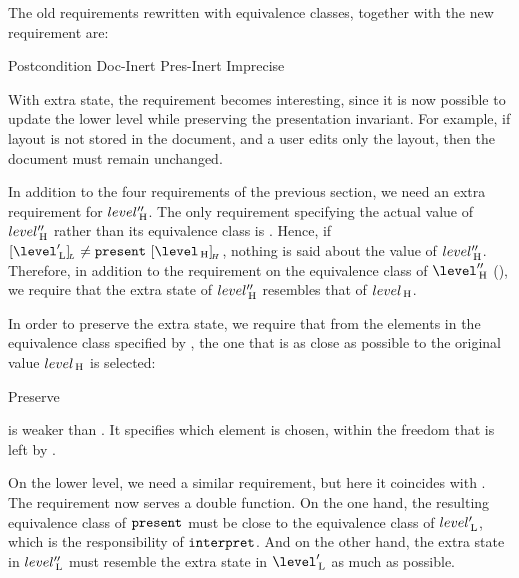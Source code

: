 The old requirements rewritten with equivalence classes, together with the new requirement are:

		{Postcondition}
  {Doc-Inert}
		{Pres-Inert}
	{Imprecise}

With extra state, the  requirement becomes interesting, since it is now possible to update the lower level while preserving the presentation invariant. For example, if layout is not stored in the document, and a user edits only the layout, then the document must remain unchanged.

In addition to the four requirements of the previous section, we need an extra requirement for $level''_{\, \mathrm H}$. The only requirement specifying the actual value of $level''_{\, \mathrm H}$ rather than its equivalence class is . Hence, if 
$\eqcl{\level'\L}{L} \neq \present~\eqcl{\level\H}{H}$, nothing is said about the value of $level''_{\, \mathrm H}$. Therefore, in addition to the requirement on the  equivalence class of $\level''\H$ (), we require that the extra state of $level''_{\, \mathrm H}$ resembles that of $level_{\, \mathrm H}$. 

In order to preserve the extra state, we require that from the elements in the equivalence class specified by , the one that is as close as possible to the original value $level_{\, \mathrm H}$ is selected:

	{Preserve}

 is weaker than . It specifies which element is chosen, within the freedom that is left by .

On the lower level, we need a similar requirement, but here it coincides with . The  requirement now serves a double function. On the one hand, the resulting equivalence class of ${\tt present}$ must be close to the equivalence class of $level'_{\, \mathrm L}$, which is the responsibility of ${\tt interpret}$. And on the other hand, the extra state in $level''_{\, \mathrm L}$ must resemble the extra state in $\level'\L$ as much as possible.


